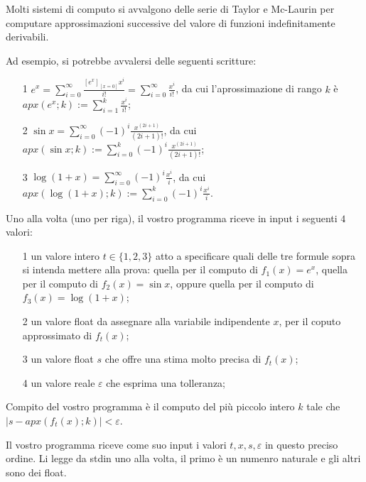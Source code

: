 \renewcommand{\nomebreve}{taylor}
\renewcommand{\titolo}{Computo approssimato di funzioni tramite Taylor e Mc-Laurin}

\newcommand{\apx}{{{apx}}}

\introduzione{}

Molti sistemi di computo si avvalgono delle serie di Taylor e Mc-Laurin per computare approssimazioni successive del valore di funzioni indefinitamente derivabili.

Ad esempio, si potrebbe avvalersi delle seguenti scritture:

\begin{itemize}
\item[1] $e^x = \sum_{i=0}^{\infty} \frac{[e^x]_{[x=0]}x^i}{i!} = \sum_{i=0}^{\infty} \frac{x^i}{i!}$, da cui l'aprossimazione di rango $k$ è $\apx(e^x;k) := \sum_{i=1}^{k} \frac{x^i}{i!}$;

\item[2] $\sin x = \sum_{i=0}^{\infty} (-1)^i \frac{x^{(2i+1)}}{(2i+1)!}$,
  da cui $\apx(\sin x;k) := \sum_{i=0}^{k} (-1)^i \frac{x^{(2i+1)}}{(2i+1)!}$;  

\item[3] $\log (1+x) = \sum_{i=0}^{\infty} (-1)^i \frac{x^i}{i}$,
  da cui $\apx(\log (1+x);k) := \sum_{i=0}^{k} (-1)^i \frac{x^i}{i}$.   
\end{itemize}

Uno alla volta (uno per riga),
il vostro programma riceve in input i seguenti $4$ valori:

\begin{itemize}
\item[1] un valore intero $t\in \{1,2,3\}$ atto a specificare quali delle tre formule sopra si intenda mettere alla prova: quella per il computo di $f_1(x)=e^x$,
  quella per il computo di $f_2(x)=\sin x$, oppure quella per il computo di $f_3(x) = \log (1+x)$;
\item[2] un valore float da assegnare alla variabile indipendente $x$, per il coputo approssimato di $f_t(x)$; 
\item[3] un valore float $s$ che offre una stima molto precisa di $f_t(x)$;
\item[4] un valore reale $\varepsilon$ che esprima una tolleranza;
\end{itemize}

Compito del vostro programma è il computo del più piccolo intero $k$
tale che $|s-\apx(f_t(x);k)| < \varepsilon$.

Il vostro programma riceve come suo input i valori $t, x, s, \varepsilon$
in questo preciso ordine. Li legge da stdin uno alla volta, il primo è un numenro naturale e gli altri sono dei float.

